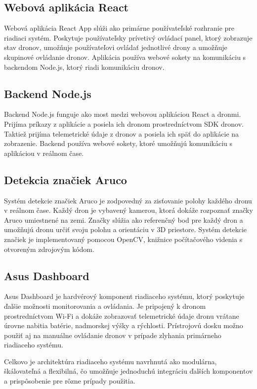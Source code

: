 \documentclass[a4paper]{feidipsp}
\begin{document}
\subsection{Webová aplikácia React}
Webová aplikácia React App slúži ako primárne používateľské rozhranie pre riadiaci systém. Poskytuje používateľsky prívetivý ovládací panel, ktorý zobrazuje stav dronov, umožňuje používateľovi ovládať jednotlivé drony a umožňuje skupinové ovládanie dronov. Aplikácia používa webové sokety na komunikáciu s backendom Node.js, ktorý riadi komunikáciu dronov.

\subsection{Backend Node.js}
Backend Node.js funguje ako most medzi webovou aplikáciou React a dronmi. Prijíma príkazy z aplikácie a posiela ich dronom prostredníctvom SDK dronov. Taktiež prijíma telemetrické údaje z dronov a posiela ich späť do aplikácie na zobrazenie. Backend používa webové sokety, ktoré umožňujú komunikáciu s aplikáciou v reálnom čase.

\subsection{Detekcia značiek Aruco}
Systém detekcie značiek Aruco je zodpovedný za zisťovanie polohy každého dronu v reálnom čase. Každý dron je vybavený kamerou, ktorá dokáže rozpoznať značky Aruco umiestnené na zemi. Značky slúžia ako referenčný bod pre každý dron a umožňujú dronu určiť svoju polohu a orientáciu v 3D priestore. Systém detekcie značiek je implementovaný pomocou OpenCV, knižnice počítačového videnia s otvoreným zdrojovým kódom.

\subsection{Asus Dashboard}
Asus Dashboard je hardvérový komponent riadiaceho systému, ktorý poskytuje ďalšie možnosti monitorovania a ovládania. Je pripojený k dronom prostredníctvom Wi-Fi a dokáže zobrazovať telemetrické údaje dronu vrátane úrovne nabitia batérie, nadmorskej výšky a rýchlosti. Prístrojovú dosku možno použiť aj na manuálne ovládanie dronov v prípade zlyhania primárneho riadiaceho systému.

Celkovo je architektúra riadiaceho systému navrhnutá ako modulárna, škálovateľná a flexibilná, čo umožňuje jednoduchú integráciu ďalších komponentov a prispôsobenie pre rôzne prípady použitia.
\end{document}
